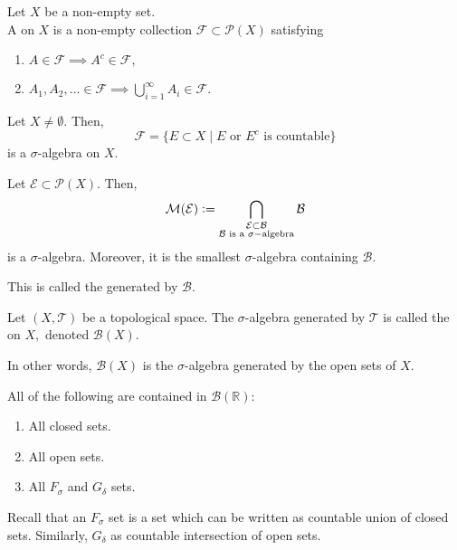 \documentclass[12pt]{article}	%
\begin{document}
\begin{defn}
	Let $X$ be a non-empty set.\\
	A  on $X$ is a non-empty collection $\mathcal{F} \subset \mathcal{P}(X)$ satisfying
	\begin{enumerate}
		\item $A \in \mathcal{F} \implies A^c \in \mathcal{F},$
		\item $A_1, A_2, \ldots \in \mathcal{F} \implies \bigcup_{i = 1}^\infty A_i \in \mathcal{F}.$
	\end{enumerate}
\end{defn}

\begin{ex}
	Let $X \neq \emptyset.$ Then,
	\begin{equation*} 
		\mathcal{F} = \{E \subset X \mid E \text{ or } E^c \text{ is countable}\}
	\end{equation*}
	is a $\sigma$-algebra on $X.$
\end{ex}

\begin{defn}
	Let $\mathcal{E} \subset \mathcal{P}(X).$ Then,
	\begin{equation*} 
		\mathcal{M}(\mathcal{E}) \vcentcolon= \bigcap_{\substack{\mathcal{E} \subset \mathcal{B}\\
		\mathcal{B} \text{ is a }\sigma-\text{algebra}}} \mathcal{B}
	\end{equation*}
	is a $\sigma$-algebra. Moreover, it is the smallest $\sigma$-algebra containing $\mathcal{B}.$

	This is called the  generated by $\mathcal{B}.$
\end{defn}

\begin{defn}
	Let $(X, \mathcal{T})$ be a topological space. The $\sigma$-algebra generated by $\mathcal{T}$ is called the  on $X,$ denoted $\mathcal{B}(X).$
\end{defn}
In other words, $\mathcal{B}(X)$ is the $\sigma$-algebra generated by the open sets of $X.$

\begin{prop}
	All of the following are contained in $\mathcal{B}(\mathbb{R})$:
	\begin{enumerate}
		\item All closed sets.
		\item All open sets.
		\item All $F_\sigma$ and $G_\delta$ sets.
	\end{enumerate}
\end{prop}
Recall that an $F_\sigma$ set is a set which can be written as countable union of closed sets. Similarly, $G_\delta$ as countable intersection of open sets.
\end{document}

